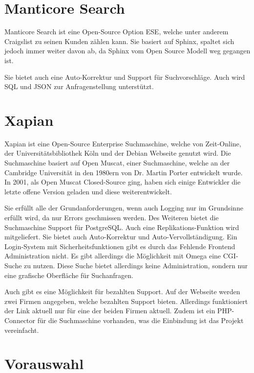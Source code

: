 \cite{Elasticsearch.2019}

\section{Manticore Search}

Manticore Search ist eine Open-Source Option ESE, welche unter anderem Craigslist zu seinen Kunden zählen kann. Sie basiert auf Sphinx, spaltet sich jedoch immer weiter davon ab, da Sphinx vom Open Source Modell weg gegangen ist.

Sie bietet auch eine Auto-Korrektur und Support für Suchvorschläge. Auch wird SQL und JSON zur Anfragenstellung unterstützt.

\cite{ManticoreSoftwareLtd.2019}


\section{Xapian}

Xapian ist eine Open-Source Enterprise Suchmaschine, welche von Zeit-Online, der Universitätsbibliothek Köln und der Debian Webseite genutzt wird. Die Suchmaschine basiert auf Open Muscat, einer Suchmaschine, welche an der Cambridge Universität in den 1980ern von Dr. Martin Porter entwickelt wurde. In 2001, als Open Muscat Closed-Source ging, haben sich einige Entwickler die letzte offene Version geladen und diese weiterentwickelt.

Sie erfüllt alle der Grundanforderungen, wenn auch Logging nur im Grundsinne erfüllt wird, da nur Errors geschmissen werden. Des Weiteren bietet die Suchmaschine Support für PostgreSQL. Auch eine Replikations-Funktion wird mitgeliefert. Sie bietet auch Auto-Korrektur und Auto-Vervollständigung. Ein Login-System mit Sicherheitsfunktionen gibt es durch das Fehlende Frontend Administration nicht. Es gibt allerdings die Möglichkeit mit Omega eine CGI-Suche zu nutzen. Diese Suche bietet allerdings keine Administration, sondern nur eine grafische Oberfläche für Suchanfragen.

Auch gibt es eine Möglichkeit für bezahlten Support. Auf der Webseite werden zwei Firmen angegeben, welche bezahlten Support bieten. Allerdings funktioniert der Link aktuell nur für eine der beiden Firmen aktuell. Zudem ist ein PHP-Connector für die Suchmaschine vorhanden, was die Einbindung ist das Projekt vereinfacht.

\cite{XAP.2019}

\section {Vorauswahl}

